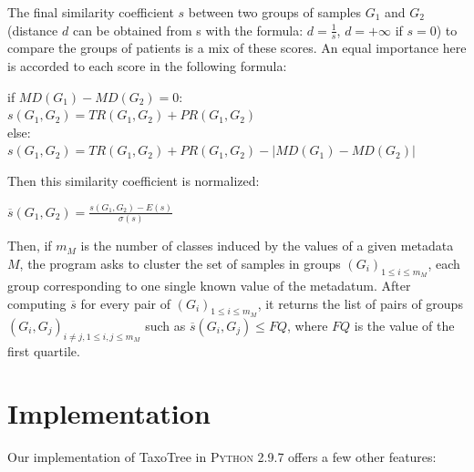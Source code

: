 \documentclass{report}
\begin{document}
The final similarity coefficient $s$ between two groups of samples $G_{1}$ and $G_{2}$ (distance $d$ can be obtained from s with the formula: $d = \frac{1}{s}$, $d = +\infty$ if $s = 0$) to compare the groups of patients is a mix of these scores. An equal importance here is accorded to each score in the following formula:\\

\begin{center}
if $MD(G_{1}) - MD(G_{2}) = 0$:\\
$s(G_{1},G_{2}) = TR(G_{1},G_{2}) + PR(G_{1},G_{2})$\\

else:\\
$s(G_{1},G_{2}) = TR(G_{1},G_{2}) + PR(G_{1},G_{2}) - | MD(G_{1}) - MD(G_{2}) |$\\
\end{center}

Then this similarity coefficient is normalized:\\
\begin{center}
$\overline{s}(G_{1},G_{2}) = \frac{s(G_{1},G_{2}) - E(s)}{\sigma(s)}$\\
\end{center}

Then, if $m_{M}$ is the number of classes induced by the values of a given metadata $M$, the program asks to cluster the set of samples in groups $(G_{i})_{1 \le i \le m_{M}}$, each group corresponding to one single known value of the metadatum. After computing $\overline{s}$ for every pair of $(G_{i})_{1 \le i \le m_{M}}$, it returns the list of pairs of groups $(G_{i},G_{j})_{i \neq j, 1 \le i,j \le m_{M}}$ such as $\overline{s}(G_{i},G_{j}) \le FQ$, where $FQ$ is the value of the first quartile. 

\section{Implementation}

Our implementation of TaxoTree in \textsc{Python 2.9.7} offers a few other features:
\end{document}
